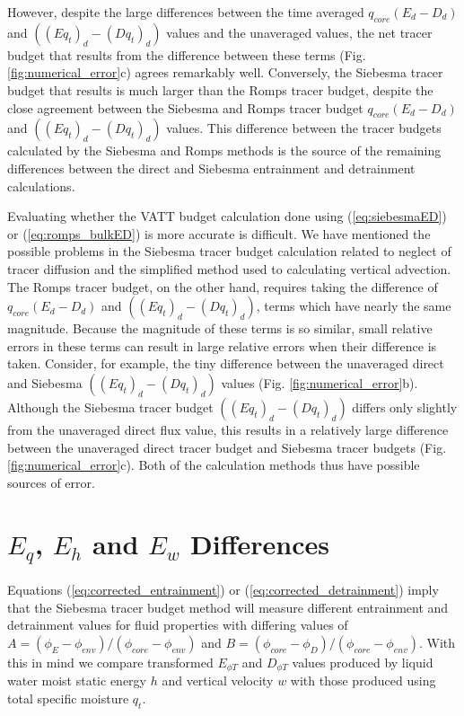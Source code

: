 \documentclass[12pt]{article}
\begin{document}
However, despite the large differences between the time averaged 
$q_{core}(E_d - D_d)$ and $((Eq_t)_d - (Dq_t)_d)$ values and the unaveraged
values, the net tracer budget that results from the difference
between these terms (Fig. \ref{fig:numerical_error}c) agrees remarkably 
well.  Conversely, the Siebesma tracer budget that results is much larger 
than the Romps tracer budget, despite the close agreement between the 
Siebesma and Romps tracer budget $q_{core}(E_d - D_d)$ and 
$((Eq_t)_d - (Dq_t)_d)$ values.  This difference between the tracer budgets
calculated by the Siebesma and Romps methods is the source of the remaining
differences between the direct and Siebesma entrainment and detrainment
calculations.

Evaluating whether the VATT budget calculation done using (\ref{eq:siebesmaED})
or (\ref{eq:romps_bulkED}) is more accurate is difficult.
We have mentioned the possible problems in the Siebesma tracer budget
calculation related to neglect of tracer diffusion and the simplified method 
used to calculating vertical advection.  The Romps tracer budget, on the other hand, requires taking the difference of $q_{core}(E_d - D_d)$ and 
$((Eq_t)_d - (Dq_t)_d)$, terms which have nearly the same magnitude.  
Because the magnitude of these terms is so similar, small relative errors in
these terms can result in large relative errors when their difference is taken.
Consider, for example, the tiny difference between the unaveraged direct and
Siebesma $((Eq_t)_d - (Dq_t)_d)$ values (Fig. \ref{fig:numerical_error}b).
Although the Siebesma tracer budget $((Eq_t)_d - (Dq_t)_d)$ differs only
slightly from the unaveraged direct flux value, this results in a relatively
large difference between the unaveraged direct tracer budget and Siebesma 
tracer budgets (Fig. \ref{fig:numerical_error}c).  Both of the calculation 
methods thus have possible sources of error.


\section{$E_q$, $E_h$ and $E_w$ Differences}

Equations (\ref{eq:corrected_entrainment}) or (\ref{eq:corrected_detrainment}) 
imply that the Siebesma tracer budget method will measure different entrainment
and detrainment values for fluid properties with differing values of 
$A = (\phi_E - \phi_{env})/(\phi_{core} - \phi_{env})$ and
$B = (\phi_{core} - \phi_D)/(\phi_{core} - \phi_{env})$.  With this in mind 
we compare transformed $E_{\phi T}$ and $D_{\phi T}$ values produced by liquid
water moist static energy $h$ and vertical velocity $w$ with those produced 
using total specific moisture $q_t$.
\end{document}
